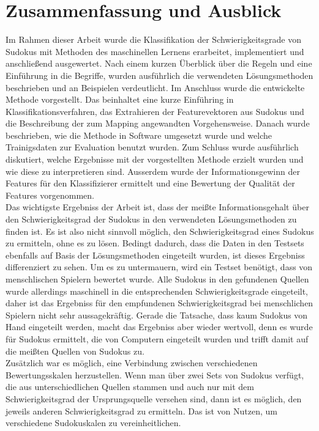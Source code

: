 \chapter{Zusammenfassung und Ausblick}
\label{Zusammenfassung}
Im Rahmen dieser Arbeit wurde die Klassifikation der Schwierigkeitsgrade von Sudokus mit Methoden des maschinellen Lernens erarbeitet, implementiert und anschließend ausgewertet. Nach einem kurzen Überblick über die Regeln und eine Einführung in die Begriffe, wurden ausführlich die verwendeten Lösungsmethoden beschrieben und an Beispielen verdeutlicht. Im Anschluss wurde die entwickelte Methode vorgestellt. Das beinhaltet eine kurze Einführing in Klassifikationsverfahren, das Extrahieren der Featurevektoren aus Sudokus und die Beschreibung der zum Mapping angewandten Vorgehensweise. Danach wurde beschrieben, wie die Methode in Software umgesetzt wurde und welche Trainigsdaten zur Evaluation benutzt wurden. Zum Schluss wurde ausführlich diskutiert, welche Ergebnisse mit der vorgestellten Methode erzielt wurden und wie diese zu interpretieren sind. Ausserdem wurde der Informationsgewinn der Features für den Klassifizierer ermittelt und eine Bewertung der Qualität der Features vorgenommen.\\
Das wichtigste Ergebniss der Arbeit ist, dass der meißte Informationsgehalt über den Schwierigkeitsgrad der Sudokus in den verwendeten Lösungsmethoden zu finden ist. Es ist also nicht sinnvoll möglich, den Schwierigkeitsgrad eines Sudokus zu ermitteln, ohne es zu lösen. Bedingt dadurch, dass die Daten in den Testsets ebenfalls auf Basis der Lösungsmethoden eingeteilt wurden, ist dieses Ergebniss differenziert zu sehen. Um es zu untermauern, wird ein Testset benötigt, dass von menschlischen Spielern bewertet wurde. Alle Sudokus in den gefundenen Quellen wurde allerdings maschinell in die entsprechenden Schwierigkeitsgrade eingeteilt, daher ist das Ergebniss für den empfundenen Schwierigkeitsgrad bei menschlichen Spielern nicht sehr aussagekräftig. Gerade die Tatsache, dass kaum Sudokus von Hand eingeteilt werden, macht das Ergebniss aber wieder wertvoll, denn es wurde für Sudokus ermittelt, die von Computern eingeteilt wurden und trifft damit auf die meißten Quellen von Sudokus zu.\\
Zusätzlich war es möglich, eine Verbindung zwischen verschiedenen Bewertungsskalen herzustellen. Wenn man über zwei Sets von Sudokus verfügt, die aus unterschiedlichen Quellen stammen und auch nur mit dem Schwierigkeitsgrad der Ursprungsquelle versehen sind, dann ist es möglich, den jeweils anderen Schwierigkeitsgrad zu ermitteln. Das ist von Nutzen, um verschiedene Sudokuskalen zu vereinheitlichen.\\
